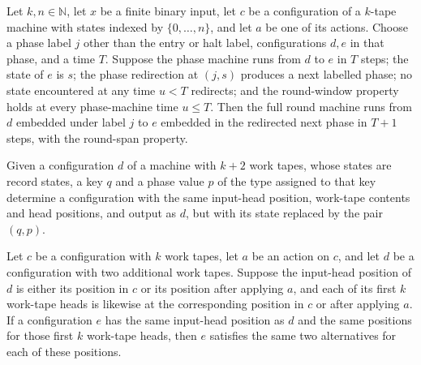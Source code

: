 \begin{lemma}
\label{Turing.StepBlock.roundTM_phase}
\leanok
{}
Let $k,n\in\mathbb{N}$, let $x$ be a finite binary input, let $c$ be a configuration of
a $k$-tape machine with states indexed by $\{0,\ldots,n\}$, and let $a$ be one of its
actions. Choose a phase label $j$ other than the entry or halt label, configurations
$d,e$ in that phase, and a time $T$. Suppose the phase machine runs from $d$ to $e$ in
$T$ steps; the state of $e$ is $s$; the phase redirection at $(j,s)$ produces a next
labelled phase; no state encountered at any time $u<T$ redirects; and the round-window
property holds at every phase-machine time $u\le T$. Then the full round machine runs
from $d$ embedded under label $j$ to $e$ embedded in the redirected next phase in $T+1$
steps, with the round-span property.
\end{lemma}

\begin{definition}
\label{Turing.StepBlock.atKey}
\leanok
{}
Given a configuration $d$ of a machine with $k+2$ work tapes, whose states are record
states, a key $q$ and a phase value $p$ of the type assigned to that key determine a
configuration with the same input-head position, work-tape contents and head positions,
and output as $d$, but with its state replaced by the pair $(q,p)$.
\end{definition}

\begin{lemma}
\label{Turing.StepBlock.roundWindow_frame}
\leanok
{}
Let $c$ be a configuration with $k$ work tapes, let $a$ be an action on $c$, and let $d$
be a configuration with two additional work tapes. Suppose the input-head position of
$d$ is either its position in $c$ or its position after applying $a$, and each of its
first $k$ work-tape heads is likewise at the corresponding position in $c$ or after
applying $a$. If a configuration $e$ has the same input-head position as $d$ and the
same positions for those first $k$ work-tape heads, then $e$ satisfies the same two
alternatives for each of these positions.
\end{lemma}

